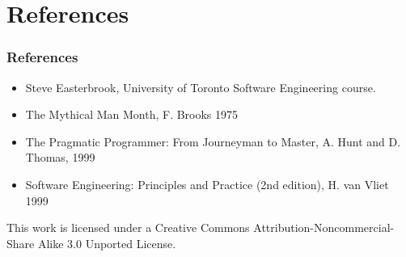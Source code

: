 \documentclass[10pt, handout]{beamer}
\begin{document}
\section{References}
\begin{frame}[fragile]
  \frametitle{References}
  \begin{itemize}
    \item Steve Easterbrook, University of Toronto Software Engineering course.
    \item The Mythical Man Month, F. Brooks 1975
    \item The Pragmatic Programmer: From Journeyman to Master, A. Hunt and
      D. Thomas, 1999
    \item Software Engineering: Principles and Practice (2nd edition), H. van Vliet 1999
  \end{itemize}
\end{frame}
\begin{frame}[fragile]
  \begin{center}
    \tiny
    This work is licensed under a Creative Commons Attribution-Noncommercial-Share Alike 3.0 Unported License.
  \end{center}
\end{frame}
\end{document}
